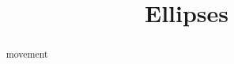 \documentclass{ximera}
\title{Ellipses}
\begin{document}
\begin{abstract}
movement
\end{abstract}
\maketitle
\end{document}
